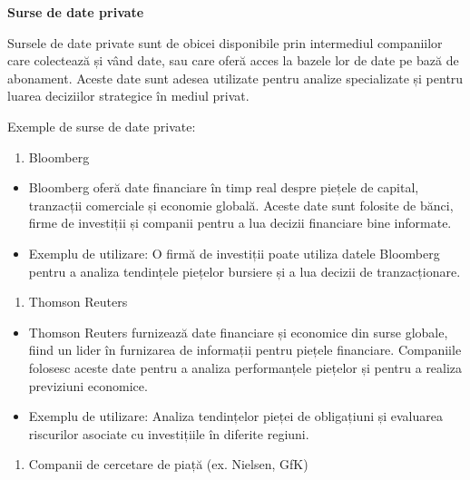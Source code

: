 \documentclass[
  11pt,
  b5paper,
  nottoc]{book}
\providecommand{\tightlist}{%
  \setlength{\itemsep}{0pt}\setlength{\parskip}{0pt}}\usepackage{longtable,booktabs,array}
\begin{document}
\textbf{Surse de date private}

Sursele de date private sunt de obicei disponibile prin intermediul
companiilor care colectează și vând date, sau care oferă acces la bazele
lor de date pe bază de abonament. Aceste date sunt adesea utilizate
pentru analize specializate și pentru luarea deciziilor strategice în
mediul privat.

Exemple de surse de date private:

\begin{enumerate}
\def\labelenumi{\arabic{enumi}.}
\tightlist
\item
  Bloomberg
\end{enumerate}

\begin{itemize}
\tightlist
\item
  Bloomberg oferă date financiare în timp real despre piețele de
  capital, tranzacții comerciale și economie globală. Aceste date sunt
  folosite de bănci, firme de investiții și companii pentru a lua
  decizii financiare bine informate.\\
\item
  Exemplu de utilizare: O firmă de investiții poate utiliza datele
  Bloomberg pentru a analiza tendințele piețelor bursiere și a lua
  decizii de tranzacționare.
\end{itemize}

\begin{enumerate}
\def\labelenumi{\arabic{enumi}.}
\setcounter{enumi}{1}
\tightlist
\item
  Thomson Reuters
\end{enumerate}

\begin{itemize}
\tightlist
\item
  Thomson Reuters furnizează date financiare și economice din surse
  globale, fiind un lider în furnizarea de informații pentru piețele
  financiare. Companiile folosesc aceste date pentru a analiza
  performanțele piețelor și pentru a realiza previziuni economice.\\
\item
  Exemplu de utilizare: Analiza tendințelor pieței de obligațiuni și
  evaluarea riscurilor asociate cu investițiile în diferite regiuni.
\end{itemize}

\begin{enumerate}
\def\labelenumi{\arabic{enumi}.}
\setcounter{enumi}{2}
\tightlist
\item
  Companii de cercetare de piață (ex. Nielsen, GfK)
\end{enumerate}
\end{document}
